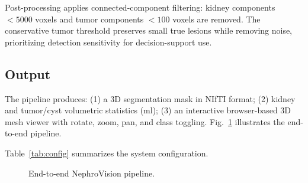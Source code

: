 Post-processing applies connected-component filtering: kidney components $< 5000$ voxels and tumor components $< 100$ voxels are removed. The conservative tumor threshold preserves small true lesions while removing noise, prioritizing detection sensitivity for decision-support use.

\subsection{Output}

The pipeline produces: (1) a 3D segmentation mask in NIfTI format; (2) kidney and tumor/cyst volumetric statistics (ml); (3) an interactive browser-based 3D mesh viewer with rotate, zoom, pan, and class toggling. Fig.~\ref{fig:pipeline} illustrates the end-to-end pipeline.



Table~\ref{tab:config} summarizes the system configuration.

\begin{figure}[!t]
\centering
{}
\caption{End-to-end NephroVision pipeline.}
\label{fig:pipeline}
\end{figure}
